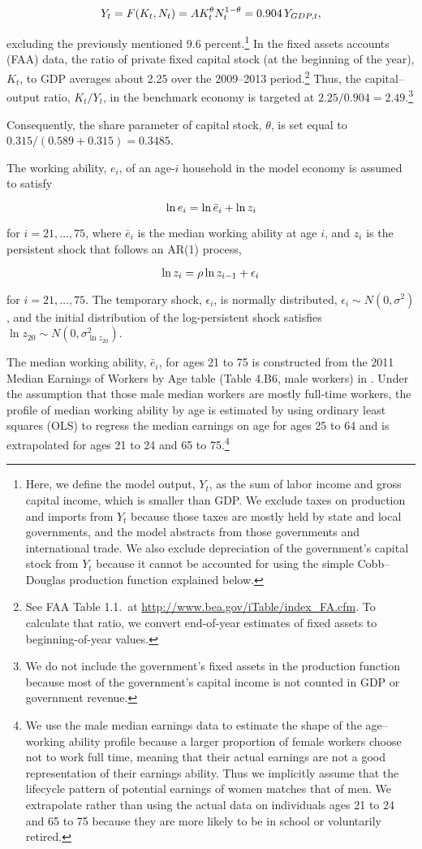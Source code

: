\documentclass[11pt,leqno,fleqn]{article}
\newcommand{\be}{\vspace{-1em}\begin{singlespace}\begin{equation}}
\newcommand{\ee}{\end{equation}\end{singlespace}}
\begin{document}
\be Y_{t}=F(K_{t},N_{t})=AK_t^{\theta}N_t^{1-\theta}=0.904\,Y_{GDP,t}, \notag \ee

excluding the previously mentioned 9.6 percent.\footnote{Here, we define the model output, $Y_{t}$, as the sum of labor income and gross capital income, which is smaller than GDP. We exclude taxes on production and imports from $Y_{t}$ because those taxes are mostly held by state and local governments, and the model abstracts from those governments and international trade. We also exclude depreciation of the government's capital stock from $Y_{t}$ because it cannot be accounted for using the simple Cobb--Douglas production function explained below.} In the fixed assets accounts (FAA) data, the ratio of private fixed capital stock (at the beginning of the year), $K_{t}$, to GDP averages about 2.25 over the 2009--2013 period.\footnote{See FAA Table 1.1.\ at \url{http://www.bea.gov/iTable/index_FA.cfm}. To calculate that ratio, we convert end-of-year estimates of fixed assets to beginning-of-year values.} Thus, the capital--output ratio, $K_{t}/Y_{t}$, in the benchmark economy is targeted at $2.25/0.904=2.49$.\footnote{We do not include the government's fixed assets in the production function because most of the government's capital income is not counted in GDP or government revenue.} 

Consequently, the share parameter of capital stock, $\theta$, is set equal to $0.315/(0.589+0.315)=0.3485$.

The working ability, $e_{i}$, of an age-$i$ household in the model economy is assumed to satisfy

\be \ln e_{i}=\ln\bar{e}_{i}+\ln z_{i} \notag \ee

for $i=21,\ldots,75$, where $\bar{e}_{i}$ is the median working ability at age $i$, and $z_{i}$ is the persistent shock that follows an AR(1) process,

\be \ln z_{i}=\rho\ln z_{i-1}+\epsilon_{i} \notag \ee

for $i=21,\ldots,75$. The temporary shock, $\epsilon_{i}$, is normally distributed, $\epsilon_{i}\sim N(0,\sigma^{2})$, and the initial distribution of the log-persistent shock satisfies $\ln z_{20}\sim N(0,\sigma^{2}_{\ln z_{20}})$.

The median working ability, $\bar{e}_{i}$, for ages 21 to 75 is constructed from the 2011 Median Earnings of Workers by Age table (Table 4.B6, male workers) in \citet{SSA:2014}. Under the assumption that those male median workers are mostly full-time workers, the profile of median working ability by age is estimated by using ordinary least squares (OLS) to regress the median earnings on age for ages 25 to 64 and is extrapolated for ages 21 to 24 and 65 to 75.\footnote{We use the male median earnings data to estimate the shape of the age--working ability profile because a larger proportion of female workers choose not to work full time, meaning that their actual earnings are not a good representation of their earnings ability. Thus we implicitly assume that the lifecycle pattern of potential earnings of women matches that of men. We extrapolate rather than using the actual data on individuals ages 21 to 24 and 65 to 75 because they are more likely to be in school or voluntarily retired.}
\end{document}
